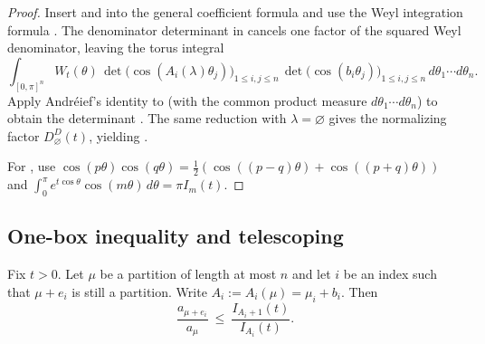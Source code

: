 \begin{proof}
Insert  and  into the general coefficient formula
 and use the Weyl integration formula .
The denominator determinant in  cancels one factor of the squared Weyl denominator,
leaving the torus integral
\begin{equation}
\label{eq:SOeven_andreief_integral}
\int_{[0,\pi]^n} W_t(\theta)\,
\det\big(\cos(A_i(\lambda)\theta_j)\big)_{1\le i,j\le n}\,
\det\big(\cos(b_i\theta_j)\big)_{1\le i,j\le n}\,d\theta_1\cdots d\theta_n.
\end{equation}
Apply Andr\'eief's identity to  (with the common product measure $d\theta_1\cdots d\theta_n$)
to obtain the determinant .
The same reduction with $\lambda=\varnothing$ gives the normalizing factor $D^D_{\varnothing}(t)$, yielding .

For , use
$\cos(p\theta)\cos(q\theta)=\tfrac12(\cos((p-q)\theta)+\cos((p+q)\theta))$ and
$\int_0^{\pi} e^{t\cos\theta}\cos(m\theta)\,d\theta=\pi I_m(t)$.
\end{proof}

\subsection{One-box inequality and telescoping}
\label{subsec:A1_Spin_even_one_box}

\begin{lemma}
\label{lem:SOeven_one_box}
Fix $t>0$.
Let $\mu$ be a partition of length at most $n$ and let $i$ be an index such that $\mu+e_i$ is still a partition.
Write $A_i:=A_i(\mu)=\mu_i+b_i$.
Then
\begin{equation}
\label{eq:SOeven_one_box_bound}
\frac{a_{\mu+e_i}}{a_{\mu}}\ \le\ \frac{I_{A_i+1}(t)}{I_{A_i}(t)}.
\end{equation}
\end{lemma}

